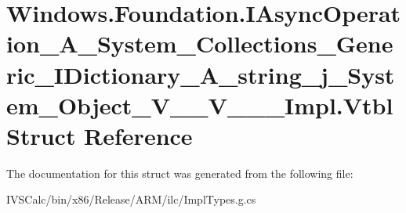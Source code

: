 \hypertarget{struct_windows_1_1_foundation_1_1_i_async_operation___a___system___collections___generic___i_dic5599512ef3ebb2b0cf45ef15af8c2632}{}\section{Windows.\+Foundation.\+I\+Async\+Operation\+\_\+\+A\+\_\+\+System\+\_\+\+Collections\+\_\+\+Generic\+\_\+\+I\+Dictionary\+\_\+\+A\+\_\+string\+\_\+j\+\_\+\+System\+\_\+\+Object\+\_\+\+V\+\_\+\+\_\+\+V\+\_\+\+\_\+\+\_\+\+Impl.\+Vtbl Struct Reference}
\label{struct_windows_1_1_foundation_1_1_i_async_operation___a___system___collections___generic___i_dic5599512ef3ebb2b0cf45ef15af8c2632}


The documentation for this struct was generated from the following file\+:\begin{DoxyCompactItemize}
\item 
I\+V\+S\+Calc/bin/x86/\+Release/\+A\+R\+M/ilc/Impl\+Types.\+g.\+cs\end{DoxyCompactItemize}

